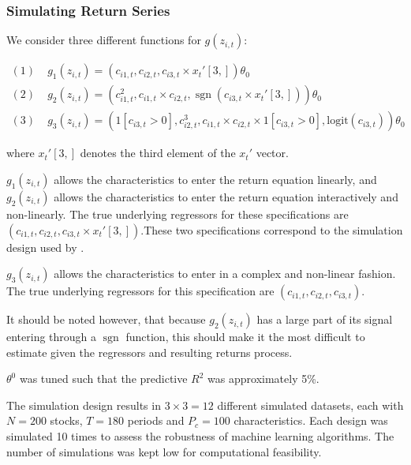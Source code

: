 \documentclass{article}
\begin{document}
\subsubsection{Simulating Return Series}

We consider three different functions for $g(z_{i, t})$:

\begin{align}
(1)\; & g_1 \left(z_{i, t}\right)=\left(c_{i 1, t}, c_{i 2, t}, c_{i 3, t} \times x_{t}'[3,]\right) \theta_{0} \\
(2)\; & g_2 \left(z_{i, t}\right)=\left(c_{i 1, t}^{2}, c_{i 1, t} \times c_{i 2, t}, \operatorname{sgn}\left(c_{i 3, t} \times  x_{t}'[3,]\right)\right) \theta_{0} \\
(3)\; & g_3 \left(z_{i, t}\right) = \left(1[c_{i3,t}>0],c_{i 2, t}^{3}, c_{i 1, t} \times c_{i 2, t}\times 1[c_{i3,t}>0], \text{logit}\left({c}_{i3, t} \right)\right) \theta_{0}
\end{align}

where $x_{t}'[3,]$ denotes the third element of the $x_{t}'$ vector.

$g_1 \left(z_{i, t}\right)$ allows the characteristics to enter the return equation linearly, and $g_2 \left(z_{i, t}\right)$ allows the characteristics to enter the return equation interactively and non-linearly. The true underlying regressors for these specifications are $\left(c_{i 1, t}, c_{i 2, t}, c_{i 3, t} \times x_{t}'[3,]\right)$.These two specifications correspond to the simulation design used by \cite{gu_empirical_2018}. 

$g_3 \left(z_{i, t}\right)$ allows the characteristics to enter in a complex and non-linear fashion. The true underlying regressors for this specification are $\left(c_{i 1, t}, c_{i 2, t}, c_{i 3, t} \right)$. 

It should be noted however, that because $g_2 \left(z_{i, t}\right)$ has a large part of its signal entering through a $\operatorname{sgn}$ function, this should make it the most difficult to estimate given the regressors and resulting returns process.

$\theta^0$ was tuned such that the predictive $R^2$ was approximately 5\%.

The simulation design results in $3 \times 3 = 12$ different simulated datasets, each with $N = 200$ stocks, $T = 180$ periods and $P_c = 100$ characteristics. Each design was simulated 10 times to assess the robustness of machine learning algorithms. The number of simulations was kept low for computational feasibility.
\end{document}

